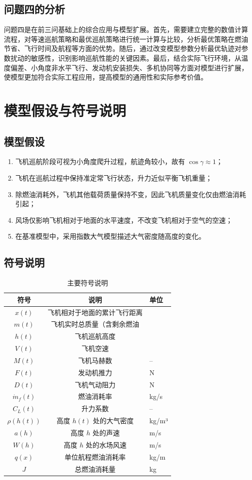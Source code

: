 \documentclass[UTF8]{ctexart}
\begin{document}
\subsection{问题四的分析}
问题四是在前三问基础上的综合应用与模型扩展。首先，需要建立完整的数值计算流程，对等速巡航策略和最优巡航策略进行统一计算与比较，分析最优策略在燃油节省、飞行时间及航程等方面的优势。随后，通过改变模型参数分析最优轨迹对参数扰动的敏感性，识别影响巡航性能的关键因素。最后，结合实际飞行环境，从温度偏差、小角度非水平飞行、发动机安装损失、多机协同等方面对模型进行扩展，使模型更加符合实际工程应用，提高模型的通用性和实际参考价值。


\section{模型假设与符号说明}

\subsection{模型假设}
\begin{enumerate}
    \item 飞机巡航阶段可视为小角度爬升过程，航迹角较小，故有 $\cos\gamma\approx 1$；
    \item 飞机在巡航过程中保持准定常飞行状态，升力近似平衡飞机重量；
    \item 除燃油消耗外，飞机其他载荷质量保持不变，因此飞机质量变化仅由燃油消耗引起；
    \item 风场仅影响飞机相对于地面的水平速度，不改变飞机相对于空气的空速；
    \item 在基准模型中，采用指数大气模型描述大气密度随高度的变化。
\end{enumerate}

\subsection{符号说明}
\begin{table}[htbp]
\centering
\caption{主要符号说明}
\label{tab:symbols}
\begin{tabular}{ccl}
\toprule
符号 & 说明 & 单位 \\
\midrule
$x(t)$ & 飞机相对于地面的累计飞行距离& \\
$m(t)$ & 飞机实时总质量（含剩余燃油& \\
$h(t)$ & 飞机巡航高度& \\
$V(t)$ & 飞机空速& \\
$M(t)$  & 飞机马赫数& -- \\
$F(t)$ & 发动机推力 & N \\
$D(t)$  & 飞机气动阻力& N \\
$\dot m_f(t)$  & 燃油消耗率& kg/s \\
$C_L(t)$ & 升力系数& -- \\
$\rho(h(t))$ & 高度 $h(t)$ 处的大气密度& kg/m³ \\
$a(h)$& 高度 $h$ 处的声速& m/s \\
$W(h)$& 高度 $h$ 处的水场风速& m/s \\
$q(x)$ & 单位航程燃油消耗率& kg/m \\
$J$ & 总燃油消耗量& kg \\
\bottomrule
\end{tabular}
\end{table}
\end{document}
